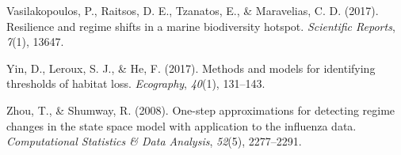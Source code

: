 \documentclass[12pt,twoside,openany]{reedthesis}
\begin{document}
\hypertarget{ref-vasilakopoulos2017resilience}{}
Vasilakopoulos, P., Raitsos, D. E., Tzanatos, E., \& Maravelias, C. D.
(2017). Resilience and regime shifts in a marine biodiversity hotspot.
\emph{Scientific Reports}, \emph{7}(1), 13647.

\hypertarget{ref-yin2017methods}{}
Yin, D., Leroux, S. J., \& He, F. (2017). Methods and models for
identifying thresholds of habitat loss. \emph{Ecography}, \emph{40}(1),
131--143.

\hypertarget{ref-zhou2008one}{}
Zhou, T., \& Shumway, R. (2008). One-step approximations for detecting
regime changes in the state space model with application to the
influenza data. \emph{Computational Statistics \& Data Analysis},
\emph{52}(5), 2277--2291.
\end{document}
